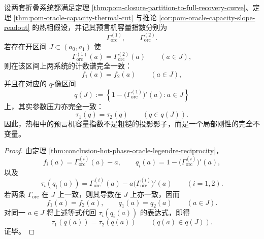 \begin{theorem}[热相预言机容量指数的局部刚性]\label{thm:conclusion-oracle-hot-phase-local-rigidity}
设两套折叠系统都满足定理 \ref{thm:pom-closure-partition-to-full-recovery-curve}、定理 \ref{thm:pom-oracle-capacity-thermal-cut} 与推论 \ref{cor:pom-oracle-capacity-slope-readout} 的热相假设，并记其预言机容量指数分别为
\[
\Gamma_{\mathrm{orc}}^{(1)},
\qquad
\Gamma_{\mathrm{orc}}^{(2)}.
\]
若存在开区间 \(J\subset(a_0,a_1)\) 使
\[
\Gamma_{\mathrm{orc}}^{(1)}(a)=\Gamma_{\mathrm{orc}}^{(2)}(a)
\qquad (a\in J),
\]
则在该区间上两系统的计数谱完全一致：
\[
f_1(a)=f_2(a)\qquad (a\in J),
\]
并且在对应的 \(q\)-像区间
\[
q(J):=\left\{1-\bigl(\Gamma_{\mathrm{orc}}^{(1)}\bigr)'(a):a\in J\right\}
\]
上，其实参数压力亦完全一致：
\[
\tau_1(q)=\tau_2(q)\qquad (q\in q(J)).
\]
因此，热相中的预言机容量指数不是粗糙的投影影子，而是一个局部刚性的完全不变量。
\end{theorem}
\begin{proof}
由定理 \ref{thm:conclusion-hot-phase-oracle-legendre-reciprocity}，
\[
f_i(a)=\Gamma_{\mathrm{orc}}^{(i)}(a)-a,
\qquad
q_i(a)=1-\bigl(\Gamma_{\mathrm{orc}}^{(i)}\bigr)'(a),
\]
以及
\[
\tau_i(q_i(a))
=
\Gamma_{\mathrm{orc}}^{(i)}(a)-a\bigl(\Gamma_{\mathrm{orc}}^{(i)}\bigr)'(a)
\qquad (i=1,2).
\]
若两条 \(\Gamma_{\mathrm{orc}}\) 在 \(J\) 上一致，则其导数在 \(J\) 上亦一致，因而
\[
f_1(a)=f_2(a),
\qquad
q_1(a)=q_2(a)
\qquad (a\in J).
\]
对同一 \(a\in J\) 将上述等式代回 \(\tau_i(q_i(a))\) 的表达式，即得
\[
\tau_1(q(a))=\tau_2(q(a))
\qquad (q(a)\in q(J)).
\]
证毕。
\end{proof}
